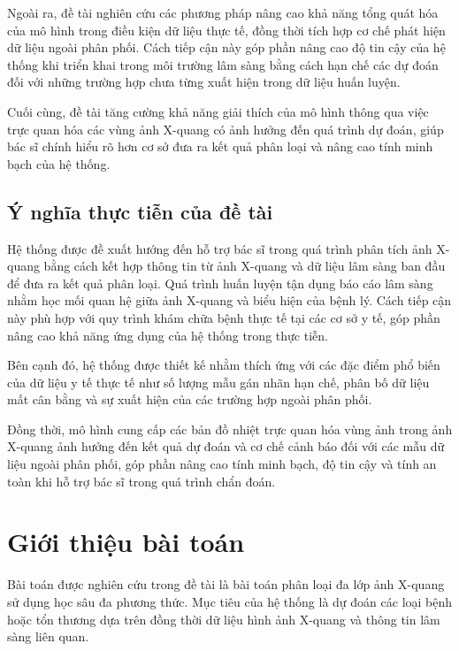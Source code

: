 Ngoài ra, đề tài nghiên cứu các phương pháp nâng cao khả năng tổng quát hóa của mô hình trong điều kiện dữ liệu thực tế, đồng thời tích hợp cơ chế phát hiện dữ liệu ngoài phân phối. Cách tiếp cận này góp phần nâng cao độ tin cậy của hệ thống khi triển khai trong môi trường lâm sàng bằng cách hạn chế các dự đoán đối với những trường hợp chưa từng xuất hiện trong dữ liệu huấn luyện.

Cuối cùng, đề tài tăng cường khả năng giải thích của mô hình thông qua việc trực quan hóa các vùng ảnh X-quang có ảnh hưởng đến quá trình dự đoán, giúp bác sĩ chính hiểu rõ hơn cơ sở đưa ra kết quả phân loại và nâng cao tính minh bạch của hệ thống.

\subsection{Ý nghĩa thực tiễn của đề tài}

Hệ thống được đề xuất hướng đến hỗ trợ bác sĩ trong quá trình phân tích ảnh X-quang bằng cách kết hợp thông tin từ ảnh X-quang và dữ liệu lâm sàng ban đầu để đưa ra kết quả phân loại. Quá trình huấn luyện tận dụng báo cáo lâm sàng nhằm học mối quan hệ giữa ảnh X-quang và biểu hiện của bệnh lý. Cách tiếp cận này phù hợp với quy trình khám chữa bệnh thực tế tại các cơ sở y tế, góp phần nâng cao khả năng ứng dụng của hệ thống trong thực tiễn.

\pagebreak

Bên cạnh đó, hệ thống được thiết kế nhằm thích ứng với các đặc điểm phổ biến của dữ liệu y tế thực tế như số lượng mẫu gán nhãn hạn chế, phân bố dữ liệu mất cân bằng và sự xuất hiện của các trường hợp ngoài phân phối. 

Đồng thời, mô hình cung cấp các bản đồ nhiệt trực quan hóa vùng ảnh trong ảnh X-quang ảnh hưởng đến kết quả dự đoán và cơ chế cảnh báo đối với các mẫu dữ liệu ngoài phân phối, góp phần nâng cao tính minh bạch, độ tin cậy và tính an toàn khi hỗ trợ bác sĩ trong quá trình chẩn đoán.

\section{Giới thiệu bài toán}

Bài toán được nghiên cứu trong đề tài là bài toán phân loại đa lớp ảnh X-quang sử dụng học sâu đa phương thức. Mục tiêu của hệ thống là dự đoán các loại bệnh hoặc tổn thương dựa trên đồng thời dữ liệu hình ảnh X-quang và thông tin lâm sàng liên quan.

